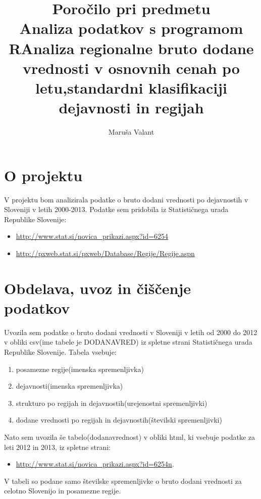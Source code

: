 \documentclass[a4paper, 11pt]{article}
\begin{document}
\title{Poročilo pri predmetu \\
Analiza podatkov s programom R}
\author{Maruša Valant}
\title{Analiza regionalne bruto 
dodane vrednosti v osnovnih cenah 
po letu,standardni klasifikaciji 
dejavnosti in regijah} 

\section{O projektu}

V projektu bom analizirala podatke o bruto dodani vrednosti po dejavnostih v Sloveniji v letih 2000-2013. Podatke sem pridobila iz Statističnega urada Republike Slovenije:

\begin{itemize}

\item{\url{http://www.stat.si/novica_prikazi.aspx?id=6254}}
\item{\url{http://pxweb.stat.si/pxweb/Database/Regije/Regije.aspn}}

\end{itemize}

\section{Obdelava, uvoz in čiščenje podatkov}

Uvozila sem podatke o bruto dodani vrednosti v Sloveniji v letih od 2000 do 2012 v obliki csv(ime tabele je DODANAVRED) iz spletne strani Statističnega urada Republike Slovenije. Tabela vsebuje:

\begin{enumerate}
\item{posamezne regije(imenska spremenljivka)}
\item{dejavnosti(imenska spremenljivka)}
\item{strukturo po regijah in dejavnostih(urejenostni spremenljivki)}
\item{dodane vrednosti po regijah in dejavnostih(številski spremenljivki)}

\end{enumerate}

Nato sem uvozila še tabelo(dodanavrednost) v obliki html, ki vsebuje podatke za leti 2012 in 2013, iz spletne strani: 
\begin{itemize}
\item{\url{http://www.stat.si/novica_prikazi.aspx?id=6254n}}.
\end{itemize}
V tabeli so podane samo številske spremenljivke o bruto dodani vrednosti za celotno Slovenijo in posamezne regije.
\end{document}
